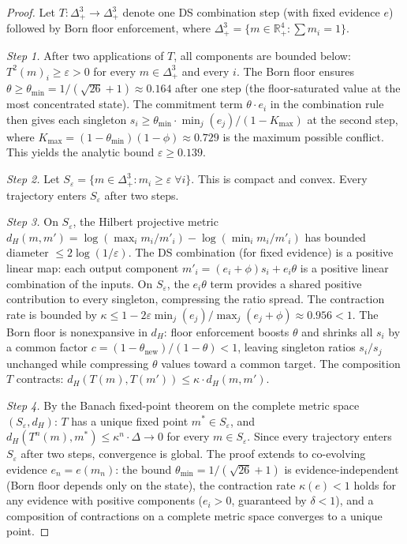 \documentclass[11pt,a4paper]{article}
\theoremstyle{definition}
\theoremstyle{remark}
\newcommand{\R}{\mathbb{R}}
\begin{document}
\begin{proof}
Let $T:\Delta^3_+\to\Delta^3_+$ denote one DS combination step (with fixed evidence $e$) followed by Born floor enforcement, where $\Delta^3_+=\{m\in\R^4_+:\sum m_i=1\}$.

\emph{Step 1.} After two applications of $T$, all components are bounded below: $T^2(m)_i\geq\varepsilon>0$ for every $m\in\Delta^3_+$ and every $i$. The Born floor ensures $\theta\geq\theta_{\min}=1/(\sqrt{26}+1)\approx 0.164$ after one step (the floor-saturated value at the most concentrated state). The commitment term $\theta\cdot e_i$ in the combination rule then gives each singleton $s_i\geq\theta_{\min}\cdot\min_j(e_j)/(1-K_{\max})$ at the second step, where $K_{\max}=(1-\theta_{\min})(1-\phi)\approx 0.729$ is the maximum possible conflict. This yields the analytic bound $\varepsilon\geq 0.139$.

\emph{Step 2.} Let $S_\varepsilon=\{m\in\Delta^3_+:m_i\geq\varepsilon\;\forall i\}$. This is compact and convex. Every trajectory enters $S_\varepsilon$ after two steps.

\emph{Step 3.} On $S_\varepsilon$, the Hilbert projective metric $d_H(m,m')=\log(\max_i m_i/m'_i)-\log(\min_i m_i/m'_i)$ has bounded diameter $\leq 2\log(1/\varepsilon)$. The DS combination (for fixed evidence) is a positive linear map: each output component $m'_i=(e_i+\phi)s_i+e_i\theta$ is a positive linear combination of the inputs. On $S_\varepsilon$, the $e_i\theta$ term provides a shared positive contribution to every singleton, compressing the ratio spread. The contraction rate is bounded by $\kappa\leq 1-2\varepsilon\min_j(e_j)/\max_j(e_j+\phi)\approx 0.956<1$. The Born floor is nonexpansive in $d_H$: floor enforcement boosts $\theta$ and shrinks all $s_i$ by a common factor $c=(1-\theta_{\mathrm{new}})/(1-\theta)<1$, leaving singleton ratios $s_i/s_j$ unchanged while compressing $\theta$ values toward a common target. The composition $T$ contracts: $d_H(T(m),T(m'))\leq\kappa\cdot d_H(m,m')$.

\emph{Step 4.} By the Banach fixed-point theorem on the complete metric space $(S_\varepsilon,d_H)$: $T$ has a unique fixed point $m^*\in S_\varepsilon$, and $d_H(T^n(m),m^*)\leq\kappa^n\cdot\Delta\to 0$ for every $m\in S_\varepsilon$. Since every trajectory enters $S_\varepsilon$ after two steps, convergence is global. The proof extends to co-evolving evidence $e_n=e(m_n)$: the bound $\theta_{\min}=1/(\sqrt{26}+1)$ is evidence-independent (Born floor depends only on the state), the contraction rate $\kappa(e)<1$ holds for any evidence with positive components ($e_i>0$, guaranteed by $\delta<1$), and a composition of contractions on a complete metric space converges to a unique point.


\end{proof}
\end{document}
